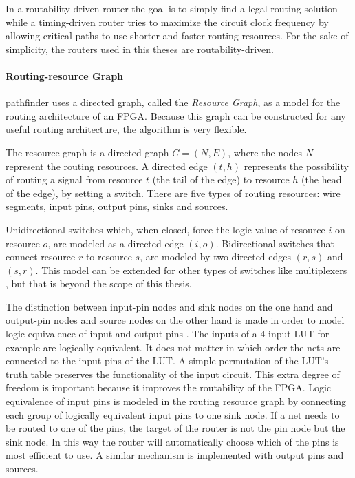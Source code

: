 \documentclass[a4paper,oneside,12pt]{article}
\begin{document}
In a routability-driven router the goal is to simply find a legal routing solution while a timing-driven router tries to maximize the circuit clock frequency by allowing critical paths to use shorter and faster routing resources. For the sake of simplicity, the routers used in this theses are routability-driven.

\paragraph{Routing-resource Graph}
{\sc pathfinder} \cite{mcmurchie1995panprff} uses a directed graph, called the {\em Resource Graph}, as a model for the routing architecture of an FPGA.  Because this graph can be constructed for any useful routing architecture, the algorithm is very flexible. 

The resource graph is a directed graph $C=(N,E)$, where the nodes $N$ represent the routing resources. A directed edge $(t,h)$ represents the possibility of routing a signal from resource $t$ (the tail of the edge) to resource $h$ (the head of the edge), by setting a switch. There are five types of routing resources: wire segments, input pins, output pins, sinks and sources.

Unidirectional switches which, when closed, force the logic value of resource $i$ on resource $o$, are modeled as a directed edge $(i,o)$. Bidirectional switches that connect resource $r$ to resource $s$, are modeled by two directed edges $(r,s)$ and $(s,r)$. This model can be extended for other types of switches like multiplexers \cite{betz1999aacfdf}, but that is beyond the scope of this thesis.

The distinction between input-pin nodes and sink nodes on the one hand and output-pin nodes and source nodes on the other hand is made in order to model logic equivalence of input and output pins \cite{betz1999aacfdf}. The inputs of a 4-input LUT for example are logically equivalent. It does not matter in which order the nets are connected to the input pins of the LUT. A simple permutation of the LUT's truth table preserves the functionality of the input circuit. This extra degree of freedom is important because it improves the routability of the FPGA. Logic equivalence of input pins is modeled in the routing resource graph by connecting each group of logically equivalent input pins to one sink node. If a net needs to be routed to one of the pins, the target of the router is not the pin node but the sink node. In this way the router will automatically choose which of the pins is most efficient to use. A similar mechanism is implemented with output pins and sources.
\end{document}
